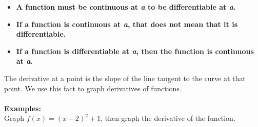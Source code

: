 \vfill

\begin{center}
    \begin{itemize}
        \item \textbf{A function must be continuous at \textit{a} to be differentiable at \textit{a}.}
        \item \textbf{If a function is continuous at \textit{a}, that does not mean that it is differentiable.}
        \item \textbf{If a function is differentiable at \textit{a}, then the function is continuous at \textit{a}.}
    \end{itemize}
\end{center}

\vfill

\newpage


The derivative at a point is the slope of the line tangent to the curve at that point. We use this fact to graph derivatives of functions.\\
\\
\noindent\textbf{Examples:}\\
Graph $\displaystyle f(x)=(x-2)^2+1$, then graph the derivative of the function.

